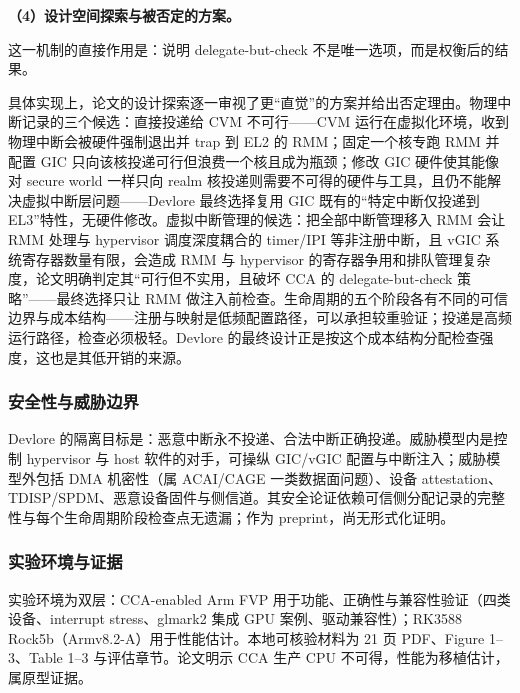 \documentclass[11pt]{ctexart}
\begin{document}
\noindent\textbf{（4）设计空间探索与被否定的方案。}\par
这一机制的直接作用是：说明 delegate-but-check 不是唯一选项，而是权衡后的结果。\par
具体实现上，论文的设计探索逐一审视了更“直觉”的方案并给出否定理由。物理中断记录的三个候选：直接投递给 CVM 不可行——CVM 运行在虚拟化环境，收到物理中断会被硬件强制退出并 trap 到 EL2 的 RMM；固定一个核专跑 RMM 并配置 GIC 只向该核投递可行但浪费一个核且成为瓶颈；修改 GIC 硬件使其能像对 secure world 一样只向 realm 核投递则需要不可得的硬件与工具，且仍不能解决虚拟中断层问题——Devlore 最终选择复用 GIC 既有的“特定中断仅投递到 EL3”特性，无硬件修改。虚拟中断管理的候选：把全部中断管理移入 RMM 会让 RMM 处理与 hypervisor 调度深度耦合的 timer/IPI 等非注册中断，且 vGIC 系统寄存器数量有限，会造成 RMM 与 hypervisor 的寄存器争用和排队管理复杂度，论文明确判定其“可行但不实用，且破坏 CCA 的 delegate-but-check 策略”——最终选择只让 RMM 做注入前检查。生命周期的五个阶段各有不同的可信边界与成本结构——注册与映射是低频配置路径，可以承担较重验证；投递是高频运行路径，检查必须极轻。Devlore 的最终设计正是按这个成本结构分配检查强度，这也是其低开销的来源。\par
\subsubsection{安全性与威胁边界}
Devlore 的隔离目标是：恶意中断永不投递、合法中断正确投递。威胁模型内是控制 hypervisor 与 host 软件的对手，可操纵 GIC/vGIC 配置与中断注入；威胁模型外包括 DMA 机密性（属 ACAI/CAGE 一类数据面问题）、设备 attestation、TDISP/SPDM、恶意设备固件与侧信道。其安全论证依赖可信侧分配记录的完整性与每个生命周期阶段检查点无遗漏；作为 preprint，尚无形式化证明。\par
\subsubsection{实验环境与证据}
实验环境为双层：CCA-enabled Arm FVP 用于功能、正确性与兼容性验证（四类设备、interrupt stress、glmark2 集成 GPU 案例、驱动兼容性）；RK3588 Rock5b（Armv8.2-A）用于性能估计。本地可核验材料为 21 页 PDF、Figure 1--3、Table 1--3 与评估章节。论文明示 CCA 生产 CPU 不可得，性能为移植估计，属原型证据。\par
\end{document}
